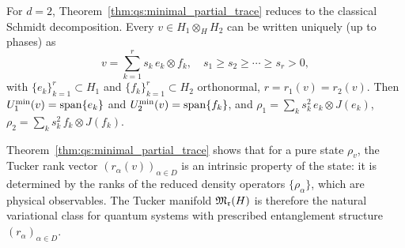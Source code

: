 \begin{remark}[The $d=2$ case: Schmidt decomposition]
\label{rem:qs:schmidt}
For $d=2$, Theorem~\ref{thm:qs:minimal_partial_trace} reduces to the
classical Schmidt decomposition. Every $v \in H_1 \otimes_H H_2$ can
be written uniquely (up to phases) as
\begin{equation*}
    v = \sum_{k=1}^r s_k\, e_k \otimes f_k,
    \quad s_1 \geq s_2 \geq \cdots \geq s_r > 0,
\end{equation*}
with $\{e_k\}_{k=1}^r \subset H_1$ and $\{f_k\}_{k=1}^r \subset H_2$
orthonormal, $r = r_1(v) = r_2(v)$. Then
$U^{\min}_{1}(v) = \mathrm{span}\{e_k\}$ and $U^{\min}_{2}(v) = \mathrm{span}\{f_k\}$,
and $\rho_1 = \sum_k s_k^2\, e_k \otimes J(e_k)$,
$\rho_2 = \sum_k s_k^2\, f_k \otimes J(f_k)$.
\end{remark}

\begin{remark}
\label{rem:qs:tucker_natural}
Theorem~\ref{thm:qs:minimal_partial_trace} shows that for a pure state
$\rho_v$, the Tucker rank vector $(r_\alpha(v))_{\alpha \in D}$ is
an intrinsic property of the state: it is determined by the ranks of
the reduced density operators $\{\rho_\alpha\}$, which are physical
observables. The Tucker manifold $\mathfrak{M}_{\mathfrak{r}}(H)$ is therefore the
natural variational class for quantum systems with prescribed
entanglement structure $(r_\alpha)_{\alpha \in D}$.
\end{remark}

